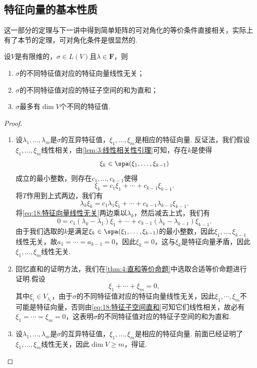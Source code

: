 \subsection{特征向量的基本性质}

这一部分的定理与下一讲中得到简单矩阵的可对角化的等价条件直接相关，实际上有了本节的定理，可对角化条件是很显然的.
\begin{theorem}\label{thm:18:特征向量的基本性质}
    设$V$是有限维的，$\sigma\in L(V)$且$\lambda\in\mathbf{F}$，则
    \begin{enumerate}
        \item $\sigma$的不同特征值对应的特征向量线性无关；

        \item $\sigma$的不同特征值对应的特征子空间的和为直和；

        \item $\sigma$最多有$\dim V$个不同的特征值.
    \end{enumerate}
\end{theorem}

\begin{proof}
    \begin{enumerate}
        \item 设$\lambda_1,\ldots,\lambda_m$是$\sigma$的互异特征值，$\xi_1,\ldots,\xi_m$是相应的特征向量. 反证法，我们假设$\xi_1,\ldots,\xi_m$线性相关，由\autoref{lem:3:线性相关性引理}可知，存在$k$是使得
        \[\xi_k\in\spa(\xi_1,\ldots,\xi_{k-1})\]
        成立的最小整数，则存在$c_1,\ldots,c_{k-1}$使得
        \begin{equation*}\label{eq:18:特征向量线性无关}
            \xi_k=c_1\xi_1+\cdots+c_{k-1}\xi_{k-1}.
        \end{equation*}
        将$T$作用到上式两边，我们有
        \[\lambda_k\xi_k=c_1\lambda_1\xi_1+\cdots+c_{k-1}\lambda_{k-1}\xi_{k-1}.\]
        将\autoref{eq:18:特征向量线性无关}两边乘以$\lambda_k$，然后减去上式，我们有
        \[0=c_1(\lambda_k-\lambda_1)\xi_1+\cdots+c_{k-1}(\lambda_k-\lambda_{k-1})\xi_{k-1}.\]
        由于我们选取的$k$是满足$\xi_k\in\spa(\xi_1,\ldots,\xi_{k-1})$的最小整数，因此$\xi_1,\ldots,\xi_{k-1}$线性无关，故$a_1=\cdots=a_{k-1}=0$，因此$\xi_k=0$，这与$\xi_k$是特征向量矛盾，因此$\xi_1,\ldots,\xi_m$线性无关.

        \item 回忆直和的证明方法，我们在\autoref{thm:4:直和等价命题}中选取合适等价命题进行证明.假设
        \begin{equation}\label{eq:18:特征子空间直和}
            \xi_1+\cdots+\xi_m=0,
        \end{equation}
        其中$\xi_i\in V_{\lambda_i}$，由于$\sigma$的不同特征值对应的特征向量线性无关，因此$\xi_1,\cdots,\xi_m$不可能是特征向量，否则由\autoref{eq:18:特征子空间直和}可知它们线性相关，故必有$\xi_1=\cdots=\xi_m=0$，这表明$\sigma$的不同特征值对应的特征子空间的和为直和.

        \item 设$\lambda_1,\ldots,\lambda_m$是$\sigma$的互异特征值，$\xi_1,\ldots,\xi_m$是相应的特征向量. 前面已经证明了$\xi_1,\ldots,\xi_m$线性无关，因此$\dim V\geqslant m$，得证.
    \end{enumerate}
\end{proof}

